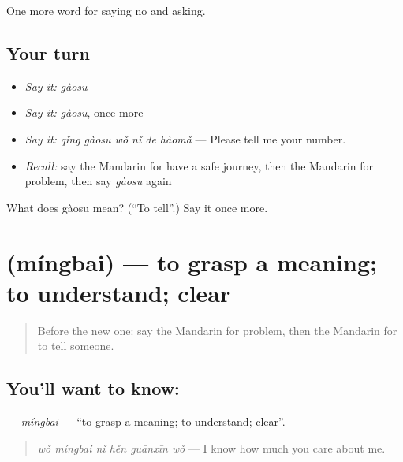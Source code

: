 \begin{grammarlens}[title={What you've built}]
One more word for saying no and asking.
\end{grammarlens}

\subsection*{Your turn}
\begin{itemize}
\raggedright
  \item \emph{Say it:} \emph{gàosu}
  \item \emph{Say it:} \emph{gàosu}, once more
  \item \emph{Say it:} \emph{qǐng gàosu wǒ nǐ de hàomǎ} — Please tell me your number.
  \item \emph{Recall:} say the Mandarin for have a safe journey, then the Mandarin for problem, then say \emph{gàosu} again
\end{itemize}

\begin{tcolorbox}[breakable,colback=teal!4,colframe=teal!35!black,title={Before you move on}]
What does gàosu mean? (\textquotedblleft{}To tell\textquotedblright{}.) Say it once more.
\end{tcolorbox}
\section[\texorpdfstring{\zh{明白} (míngbai)}{明白 (míngbai)}]{ (míngbai) — to grasp a meaning; to understand; clear}

\label{lesson:ZH-C214-mingbai}



\begin{quote}
Before the new one: say the Mandarin for problem, then the Mandarin for to tell someone.
\end{quote}

\subsection*{You'll want to know: }
\textbf{} — \emph{míngbai} — \textquotedblleft{}to grasp a meaning; to understand; clear\textquotedblright{}.

\begin{quote}
\textbf{} \emph{wǒ míngbai nǐ hěn guānxīn wǒ} — I know how much you care about me.
\end{quote}

